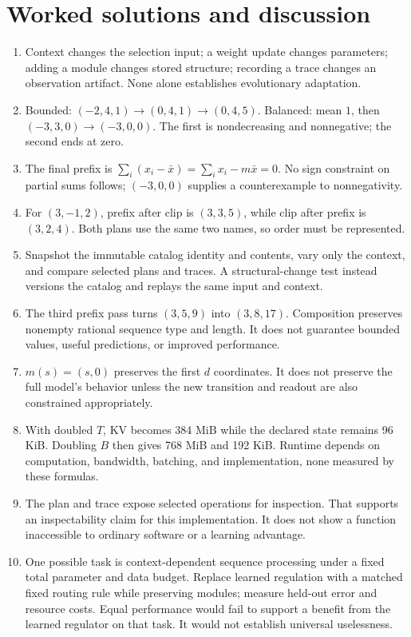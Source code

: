 \section{Worked solutions and discussion}\label{sec:solutions}
\begin{enumerate}
\item Context changes the selection input; a weight update changes parameters; adding a module changes stored structure; recording a trace changes an observation artifact. None alone establishes evolutionary adaptation.
\item Bounded: $(-2,4,1)\to(0,4,1)\to(0,4,5)$. Balanced: mean $1$, then $(-3,3,0)\to(-3,0,0)$. The first is nondecreasing and nonnegative; the second ends at zero.
\item The final prefix is $\sum_i(x_i-\bar x)=\sum_i x_i-m\bar x=0$. No sign constraint on partial sums follows; $(-3,0,0)$ supplies a counterexample to nonnegativity.
\item For $(3,-1,2)$, prefix after clip is $(3,3,5)$, while clip after prefix is $(3,2,4)$. Both plans use the same two names, so order must be represented.
\item Snapshot the immutable catalog identity and contents, vary only the context, and compare selected plans and traces. A structural-change test instead versions the catalog and replays the same input and context.
\item The third prefix pass turns $(3,5,9)$ into $(3,8,17)$. Composition preserves nonempty rational sequence type and length. It does not guarantee bounded values, useful predictions, or improved performance.
\item $m(s)=(s,0)$ preserves the first $d$ coordinates. It does not preserve the full model's behavior unless the new transition and readout are also constrained appropriately.
\item With doubled $T$, KV becomes 384 MiB while the declared state remains 96 KiB. Doubling $B$ then gives 768 MiB and 192 KiB. Runtime depends on computation, bandwidth, batching, and implementation, none measured by these formulas.
\item The plan and trace expose selected operations for inspection. That supports an inspectability claim for this implementation. It does not show a function inaccessible to ordinary software or a learning advantage.
\item One possible task is context-dependent sequence processing under a fixed total parameter and data budget. Replace learned regulation with a matched fixed routing rule while preserving modules; measure held-out error and resource costs. Equal performance would fail to support a benefit from the learned regulator on that task. It would not establish universal uselessness.
\end{enumerate}

